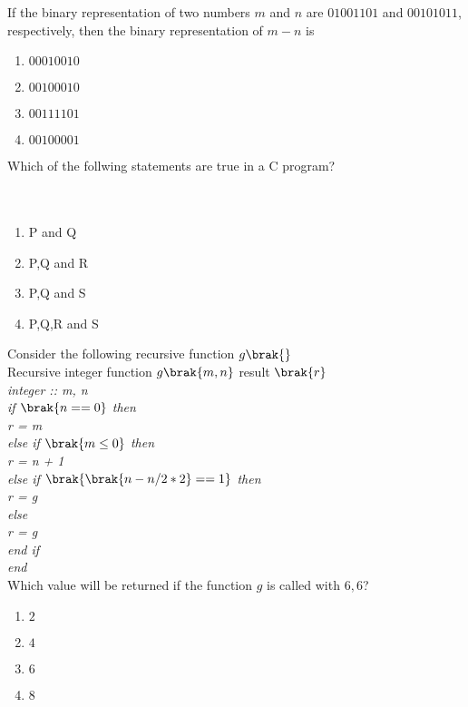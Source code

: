 \item{
If the binary representation of two numbers $m$ and $n$ are $01001101$ and $00101011$, respectively, then the binary representation of $m-n$ is 
\begin{multicols}{4}
\begin{enumerate}
\item $00010010$
\item $00100010$
\item $00111101$
\item $00100001$
\end{enumerate}
\end{multicols}
}
\item{
Which of the follwing statements are true in a C program?
\\
\\
\\
\begin{multicols}{4}
\begin{enumerate}
\item P and Q
\item P,Q and R
\item P,Q and S
\item P,Q,R and S
\end{enumerate}
\end{multicols}
}
\item{
Consider the following recursive function $g\brak{}$\\
Recursive integer function $g\brak{m, n}$ result $\brak{r}$\\
    \textit{integer :: m, n\\
    if $\brak{n == 0}$ then\\
        r = m\\
    else if $\brak{m \leq 0}$ then\\
        r = n + 1\\
    else if $\brak{\brak{n - n / 2 * 2} == 1}$ then\\
        r = g\\
    else\\
        r = g\\
    end if\\
end\\}
Which value will be returned if the function $g$ is called with $6,6$?
\begin{enumerate}
\item $2$
\item $4$
\item $6$
\item $8$
\end{enumerate}
}
